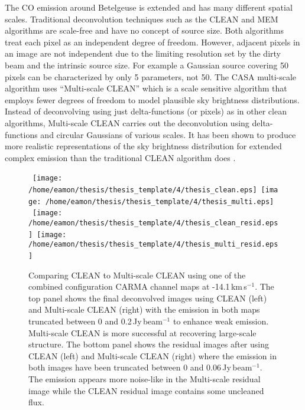 The CO emission around Betelgeuse is extended and has many different spatial scales. Traditional deconvolution techniques such as the CLEAN and MEM algorithms are scale-free and have no concept of source size. Both algorithms treat each pixel as an independent degree of freedom. However, adjacent pixels in an image are not independent due to the limiting resolution set by the dirty beam and the intrinsic source size. For example a Gaussian source covering 50 pixels can be characterized by only 5 parameters, not 50. The CASA multi-scale algorithm uses ``Multi-scale CLEAN'' \citep{cornwell_2008} which is a scale sensitive algorithm that employs fewer degrees of freedom to model plausible sky brightness distributions. Instead of deconvolving using just delta-functions (or pixels) as in other clean algorithms, Multi-scale CLEAN carries out the deconvolution using delta-functions and circular Gaussians of various scales. It has been shown to produce more realistic representations of the sky brightness distribution for extended complex emission than the traditional CLEAN algorithm does \citep{rich_2008}.

\begin{figure}[hbt!]
\centering 
\mbox{
\texttt{[image: /home/eamon/thesis/thesis\_template/4/thesis\_clean.eps]}  
\texttt{[image: /home/eamon/thesis/thesis\_template/4/thesis\_multi.eps]}  
}
\mbox{
\texttt{[image: /home/eamon/thesis/thesis\_template/4/thesis\_clean\_resid.eps]}  
\texttt{[image: /home/eamon/thesis/thesis\_template/4/thesis\_multi\_resid.eps]}  
}
\caption[Comparing CLEAN to Multi-scale CLEAN.]{Comparing CLEAN to Multi-scale CLEAN using one of the combined configuration CARMA channel maps at -14.1\,km\,s$^{-1}$. The top panel shows the final deconvolved images using CLEAN (left) and Multi-scale CLEAN (right) with the emission in both maps truncated between 0 and 0.2\,Jy\,beam$^{-1}$ to enhance weak emission. Multi-scale CLEAN is more successful at recovering large-scale structure. The bottom panel shows the residual images after using CLEAN (left) and Multi-scale CLEAN (right) where the emission in both images have been truncated between 0 and 0.06\,Jy\,beam$^{-1}$. The emission appears more noise-like in the Multi-scale residual image while the CLEAN residual image contains some uncleaned flux.}
\label{fig:4.9}
\end{figure}

